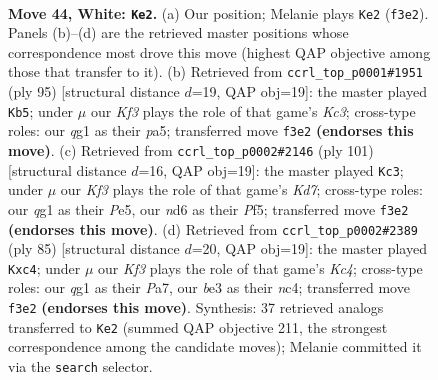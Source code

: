 \documentclass[11pt]{article}
\begin{document}
\clearpage

\begin{figure}[p]\centering
\begin{subfigure}{0.46\textwidth}\centering
\resizebox{\linewidth}{!}{%
\newchessgame
\chessboard[
  setfen={4k3/8/3n4/8/1p6/1P2bK2/8/6q1 w - - 8 44},
  showmover=false,
  pgfstyle=straightmove, color=movearrow, markmove={f3-e2}
]}
\caption{}
\end{subfigure}\hfill
\begin{subfigure}{0.46\textwidth}\centering
\resizebox{\linewidth}{!}{%
\newchessgame
\chessboard[
  setfen={8/8/1Bk5/P6p/5p2/8/8/3K4 b - - 3 48},
  showmover=false,
  pgfstyle=straightmove, color=movearrow, markmove={c6-b5}
]}
\caption{}
\end{subfigure}
\\[4pt]
\begin{subfigure}{0.46\textwidth}\centering
\resizebox{\linewidth}{!}{%
\newchessgame
\chessboard[
  setfen={8/8/8/p3pp2/P7/8/3kB3/5K2 b - - 5 51},
  showmover=false,
  pgfstyle=straightmove, color=movearrow, markmove={d2-c3}
]}
\caption{}
\end{subfigure}\hfill
\begin{subfigure}{0.46\textwidth}\centering
\resizebox{\linewidth}{!}{%
\newchessgame
\chessboard[
  setfen={8/p7/6p1/2k3P1/2N5/4KP2/8/8 b - - 0 43},
  showmover=false,
  pgfstyle=straightmove, color=movearrow, markmove={c5-c4}
]}
\caption{}
\end{subfigure}
\caption{\textbf{Move 44, White: \texttt{Ke2}.} (a) Our position; Melanie plays \texttt{Ke2} (\texttt{f3e2}). Panels (b)--(d) are the retrieved master positions whose correspondence most drove this move (highest QAP objective among those that transfer to it). (b) Retrieved from \texttt{ccrl\_top\_p0001\#1951} (ply 95) [structural distance $d$=19, QAP obj=19]: the master played \texttt{Kb5}; under $\mu$ our \emph{Kf3} plays the role of that game's \emph{Kc3}; cross-type roles: our \emph{q}g1 as their \emph{p}a5; transferred move \texttt{f3e2} \textbf{(endorses this move)}. (c) Retrieved from \texttt{ccrl\_top\_p0002\#2146} (ply 101) [structural distance $d$=16, QAP obj=19]: the master played \texttt{Kc3}; under $\mu$ our \emph{Kf3} plays the role of that game's \emph{Kd7}; cross-type roles: our \emph{q}g1 as their \emph{P}e5, our \emph{n}d6 as their \emph{P}f5; transferred move \texttt{f3e2} \textbf{(endorses this move)}. (d) Retrieved from \texttt{ccrl\_top\_p0002\#2389} (ply 85) [structural distance $d$=20, QAP obj=19]: the master played \texttt{Kxc4}; under $\mu$ our \emph{Kf3} plays the role of that game's \emph{Kc4}; cross-type roles: our \emph{q}g1 as their \emph{P}a7, our \emph{b}e3 as their \emph{n}c4; transferred move \texttt{f3e2} \textbf{(endorses this move)}. Synthesis: 37 retrieved analogs transferred to \texttt{Ke2} (summed QAP objective 211, the strongest correspondence among the candidate moves); Melanie committed it via the \texttt{search} selector.}
\label{fig:thought-m86}
\end{figure}
\end{document}
